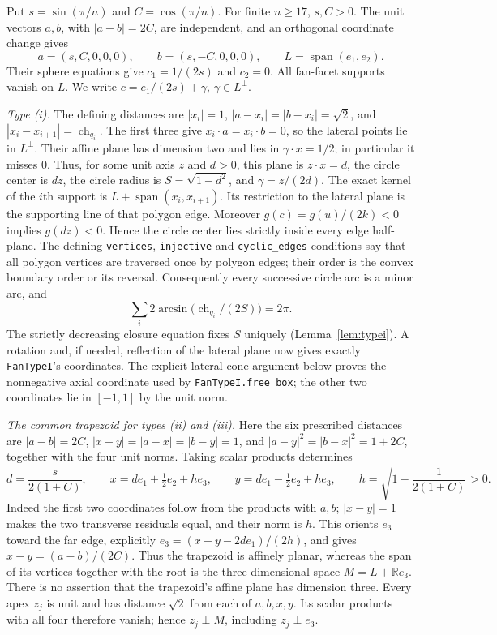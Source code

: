 \documentclass[11pt]{article}
\theoremstyle{definition}
\theoremstyle{remark}
\newcommand{\ch}{\operatorname{ch}}
\begin{document}
Put $s=\sin(\pi/n)$ and $C=\cos(\pi/n)$. For finite $n\ge17$,
$s,C>0$. The unit vectors $a,b$, with $|a-b|=2C$, are independent,
and an orthogonal coordinate change gives
\[
 a=(s,C,0,0,0),\qquad b=(s,-C,0,0,0),\qquad
 L=\operatorname{span}(e_1,e_2).
\]
Their sphere equations give $c_1=1/(2s)$ and $c_2=0$.
All fan-facet supports vanish on $L$. We write
$c=e_1/(2s)+\gamma$, $\gamma\in L^\perp$.

\emph{Type (i).}
The defining distances are $|x_i|=1$,
$|a-x_i|=|b-x_i|=\sqrt2$, and
$|x_i-x_{i+1}|=\ch_{q_i}$. The first three give
$x_i\cdot a=x_i\cdot b=0$, so the lateral points lie in $L^\perp$.
Their affine plane has dimension two and lies in
$\gamma\cdot x=1/2$; in particular it misses $0$. Thus, for some unit
axis $z$ and $d>0$, this plane is $z\cdot x=d$, the circle center is
$dz$, the circle radius is $S=\sqrt{1-d^2}$, and
$\gamma=z/(2d)$. The exact kernel of the $i$th support is
$L+\operatorname{span}(x_i,x_{i+1})$. Its restriction to the lateral
plane is the supporting line of that polygon edge. Moreover
$g(c)=g(u)/(2k)<0$ implies $g(dz)<0$. Hence the circle center lies
strictly inside every edge half-plane. The defining
\texttt{vertices}, \texttt{injective} and \texttt{cyclic\_edges}
conditions say that all polygon vertices are traversed once by polygon
edges; their order is the convex boundary order or its reversal.
Consequently every successive circle arc is a minor arc, and
\[
 \sum_i2\arcsin\bigl(\ch_{q_i}/(2S)\bigr)=2\pi.
\]
The strictly decreasing closure equation fixes $S$ uniquely
(Lemma~\ref{lem:typei}). A rotation and, if needed, reflection of the
lateral plane now gives exactly \texttt{FanTypeI}'s coordinates.
The explicit lateral-cone argument below proves the nonnegative axial
coordinate used by \texttt{FanTypeI.free\_box}; the other two
coordinates lie in $[-1,1]$ by the unit norm.

\emph{The common trapezoid for types (ii) and (iii).}
Here the six prescribed distances are $|a-b|=2C$,
$|x-y|=|a-x|=|b-y|=1$, and
$|a-y|^2=|b-x|^2=1+2C$, together with the four unit norms.
Taking scalar products determines
\[
 d=\frac{s}{2(1+C)},\qquad
 x=d e_1+\tfrac12e_2+h e_3,\qquad
 y=d e_1-\tfrac12e_2+h e_3,\qquad
 h=\sqrt{1-\frac1{2(1+C)}}>0.
\]
Indeed the first two coordinates follow from the products with $a,b$;
$|x-y|=1$ makes the two transverse residuals equal, and their norm is
$h$. This orients $e_3$ toward the far edge, explicitly
$e_3=(x+y-2d e_1)/(2h)$, and gives
$x-y=(a-b)/(2C)$. Thus the trapezoid is affinely planar, whereas the
span of its vertices together with the root is the three-dimensional
space $M=L+\mathbb R e_3$. There is no assertion that the trapezoid's
affine plane has dimension three.
Every apex $z_j$ is unit and has distance $\sqrt2$ from each of
$a,b,x,y$. Its scalar products with all four therefore vanish; hence
$z_j\perp M$, including $z_j\perp e_3$.
\end{document}
